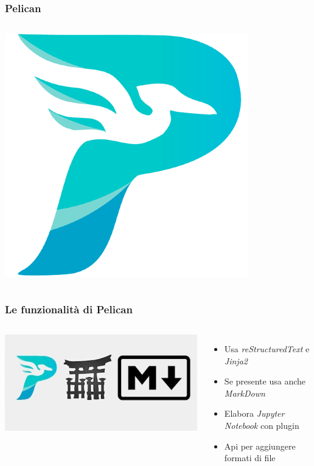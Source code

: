 \begin{frame}
	\frametitle{Pelican}
	\begin{columns}
		\begin{center}
		\includegraphics[scale=0.2]{img/pelican_logo}
		\end{center}
		\begin{center}
		\end{center}
	\end{columns}
\end{frame}

\begin{frame}
	\frametitle{Le funzionalità di Pelican}

	\begin{columns}
			\column{0.5\textwidth}
	\begin{center}
	\includegraphics[scale=0.2]{img/pelican_stuff}
	\end{center}
		\column{0.5\textwidth}
	\begin{itemize}
	\item Usa \textit{reStructuredText} e \textit{Jinja2}
  \item Se presente usa anche \textit{MarkDown}
  \item Elabora \textit{Jupyter Notebook} con plugin
  \item Api per aggiungere formati di file
	\end{itemize}
	\end{columns}
\end{frame}

